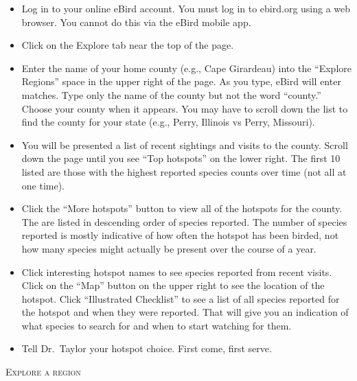 \documentclass[12pt]{article}
\begin{document}
\begin{itemize}
\item Log in to your online eBird account. You must log in to ebird.org using a web browser. You cannot do this via the eBird mobile app.

\item Click on the Explore tab near the top of the page.

\item Enter the name of your home county (e.g., Cape Girardeau) into the “Explore Regions” space in the upper right of the page. As you type, eBird will enter matches. Type only the name of the county but not the word “county.” Choose your county when it appears. You may have to scroll down the list to find the county for your state (e.g., Perry, Illinois vs Perry, Missouri).

\item You will be presented a list of recent sightings and visits to the county. Scroll down the page until you see “Top hotspots” on the lower right. The first 10 listed are those with the highest reported species counts over time (not all at one time). 

\item Click the “More hotspots” button to view all of the hotspots for the county. The are listed in descending order of species reported. The number of species reported is mostly indicative of how often the hotspot has been birded, not how many species might actually be present over the course of a year.

\item Click interesting hotspot names to see species reported from recent visits. Click on the “Map” button on the upper right to see the location of the hotspot. Click “Illustrated Checklist” to see a list of all species reported for the hotspot and when they were reported. That will give you an indication of what species to search for and when to start watching for them.

\item Tell Dr.~Taylor your hotspot choice. First come, first serve.

\end{itemize}

\newpage

\textsc{Explore a region}
\end{document}
